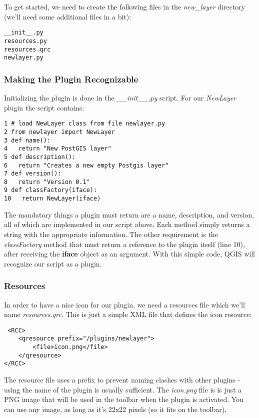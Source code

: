 To get started, we need to create the following files in the \textsl{new\_layer} directory (we'll need some additional files in a bit):

\begin{verbatim}
__init__.py 
resources.py
resources.qrc
newlayer.py
\end{verbatim} 

\subsubsection{Making the Plugin Recognizable}

Initializing the plugin is done in the \textsl{\_\_init\_\_.py} script.
For our \textsl{NewLayer} plugin the script contains:

\begin{verbatim}
1 # load NewLayer class from file newlayer.py
2 from newlayer import NewLayer
3 def name():
4   return "New PostGIS layer"
5 def description():
6   return "Creates a new empty Postgis layer"
7 def version():
8   return "Version 0.1"
9 def classFactory(iface):
10   return NewLayer(iface)
\end{verbatim} 

The mandatory things a plugin must return are a name, description, and version, all of which are implemented in our script above.
Each method simply returns a string with the appropriate information.
The other requirement is the \textsl{classFactory} method that must return a reference to the plugin itself (line 10), after receiving the \textbf{iface} object as an argument.
With this simple code, QGIS will recognize our script as a plugin.

\subsubsection{Resources}

In order to have a nice icon for our plugin, we need a resources file which we'll name \textsl{resources.qrc}.
This is just a simple XML file that defines the icon resource:

\begin{verbatim}
 <RCC>
    <qresource prefix="/plugins/newlayer">
        <file>icon.png</file>
    </qresource>
</RCC> 
\end{verbatim} 

The resource file uses a prefix to prevent naming clashes with other plugins - using the name of the plugin is usually sufficient.
The \textsl{icon.png} file is is just a PNG image that will be used in the toolbar when the plugin is activated.
You can use any image, as long as it's 22x22 pixels (so it fits on the toolbar).

